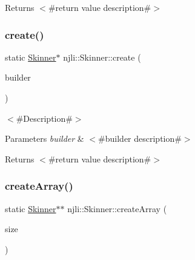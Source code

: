 \begin{DoxyReturn}{Returns}
$<$\#return value description\#$>$ 
\end{DoxyReturn}
\mbox{\label{classnjli_1_1_skinner_abde17c25b0dd465be2cf5a9eec8fbea6}} 
\subsubsection{\texorpdfstring{create()}{create()}\hspace{0.1cm}{\footnotesize\ttfamily [3/3]}}
{\footnotesize\ttfamily static \mbox{\hyperlink{classnjli_1_1_skinner}{Skinner}}$\ast$ njli\+::\+Skinner\+::create (\begin{DoxyParamCaption}\item[{const \mbox{\hyperlink{classnjli_1_1_skinner_builder}{Skinner\+Builder}} \&}]{builder }\end{DoxyParamCaption})\hspace{0.3cm}{\ttfamily [static]}}

$<$\#\+Description\#$>$


\begin{DoxyParams}{Parameters}
{\em builder} & $<$\#builder description\#$>$\\
\hline
\end{DoxyParams}
\begin{DoxyReturn}{Returns}
$<$\#return value description\#$>$ 
\end{DoxyReturn}
\mbox{\label{classnjli_1_1_skinner_a0734a98004e5c67690903c48a1d63115}} 
\subsubsection{\texorpdfstring{create\+Array()}{createArray()}}
{\footnotesize\ttfamily static \mbox{\hyperlink{classnjli_1_1_skinner}{Skinner}}$\ast$$\ast$ njli\+::\+Skinner\+::create\+Array (\begin{DoxyParamCaption}\item[{const \mbox{\hyperlink{_util_8h_a10e94b422ef0c20dcdec20d31a1f5049}{u32}}}]{size }\end{DoxyParamCaption})\hspace{0.3cm}{\ttfamily [static]}}

